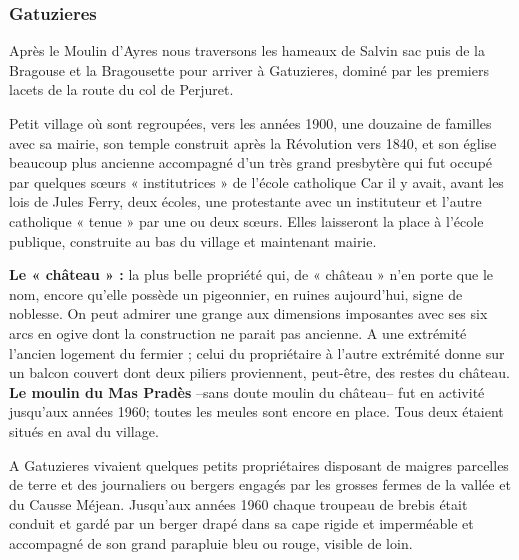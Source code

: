 \subsubsection{Gatuzieres}


\vspace{0.45cm}

Après le Moulin d’Ayres nous traversons les hameaux de Salvin sac puis de la Bragouse et la
Bragousette pour arriver à Gatuzieres, dominé par les premiers lacets de la route du col de Perjuret.

\vspace{0.3cm}

Petit village où sont regroupées, vers les années 1900, une douzaine de familles avec sa mairie,
son temple construit après la Révolution vers 1840, et son église beaucoup plus ancienne
accompagné d’un très grand presbytère qui fut occupé par quelques sœurs « institutrices » de
l’école catholique Car il y avait, avant les lois de Jules Ferry, deux écoles, une protestante
avec un instituteur et l’autre catholique « tenue » par une ou deux sœurs. Elles laisseront la
place à l’école publique, construite au bas du village et maintenant mairie.

\vspace{0.3cm}

\textbf{Le « château » :} la plus belle propriété qui, de « château » n’en porte que le nom, encore qu’elle
possède un pigeonnier, en ruines aujourd’hui, signe de noblesse. On peut admirer une grange aux
dimensions imposantes avec ses six arcs en ogive dont la construction ne parait pas ancienne. A une
extrémité l’ancien logement du fermier ; celui du propriétaire à l’autre extrémité donne sur un
balcon couvert dont deux piliers proviennent, peut-être, des restes du château. \textbf{Le moulin du Mas
Pradès} --sans doute moulin du château-- fut en activité jusqu’aux années 1960; toutes les meules sont
encore en place. Tous deux étaient situés en aval du village.

\vspace{0.3cm}

A Gatuzieres vivaient quelques petits propriétaires disposant de maigres parcelles de terre et
des journaliers ou bergers engagés par les grosses fermes de la vallée et du Causse Méjean.
Jusqu’aux années 1960 chaque troupeau de brebis était conduit et gardé par un berger drapé
dans sa cape rigide et imperméable et accompagné de son grand parapluie bleu ou rouge,
visible de loin.

\vspace{0.3cm}

